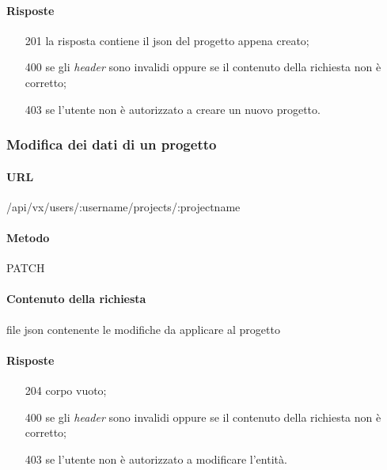 \paragraph{Risposte}
\begin{itemize}
	\item[201] la risposta contiene il \gls{json} del progetto appena creato;
	\item[400] se gli \emph{header} sono invalidi oppure se il contenuto della richiesta non è corretto;
	\item[403] se l'utente non è autorizzato a creare un nuovo progetto.
\end{itemize}

\subsubsection{Modifica dei dati di un progetto}
\paragraph{URL}
/api/vx/users/:username/projects/:projectname
\paragraph{Metodo}
PATCH
\paragraph{Contenuto della richiesta}
file \gls{json} contenente le modifiche da applicare al progetto
\paragraph{Risposte}
\begin{itemize}
	\item[204] corpo vuoto;
	\item[400] se gli \emph{header} sono invalidi oppure se il contenuto della richiesta non è corretto;
	\item[403] se l'utente non è autorizzato a modificare l'entità.
\end{itemize}



